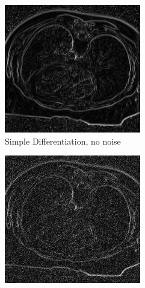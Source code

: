 \begin{figure}[H]
  \centering
  
  \begin{subfigure}{.5\textwidth}
    \centering
    \includegraphics[width=.9\textwidth]{./edgedetection/images/sd_no_noise}
    \caption{Simple Differentiation, no noise}
    \label{fig:sd_no_noise}
  \end{subfigure}%
  \begin{subfigure}{.5\textwidth}
    \centering
    \includegraphics[width=.9\textwidth]{./edgedetection/images/sd_001_noise}

\end{subfigure}
\end{figure}
